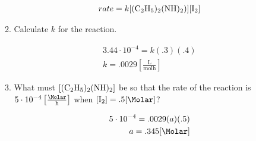 \documentclass[12pt]{article}
\begin{document}
\begin{enumerate}
\begin{enumerate}
        \begin{equation}
          \begin{split}
          rate=k[\ce{(C2H5)2(NH)2)}][\ce{I2}]
          \end{split}
          \label{2}
        \end{equation}

      \item Calculate $k$ for the reaction.

        \begin{equation}
          \begin{split}
            3.44\cdot10^{-4}=k(.3)(.4)\\
            k=.0029\left[  \frac{\si{\liter}}{\si{\mole\hour}} \right]
          \end{split}
          \label{3}
        \end{equation}

      \item What must $[\ce{(C2H5)2(NH)2}]$ be so that the rate of the reaction is $5\cdot10^{-4}\left[ \frac{\si{\Molar}}{\si{\hour}} \right]$ when $[\ce{I2}]=.5[\si{\Molar}]$?

        \begin{equation}
          \begin{split}
            5\cdot10^{-4}=.0029(a)(.5)\\
            a=.345[\si{\Molar}]
          \end{split}
          \label{4}
        \end{equation}

    \end{enumerate}

\end{enumerate}
\end{document}
